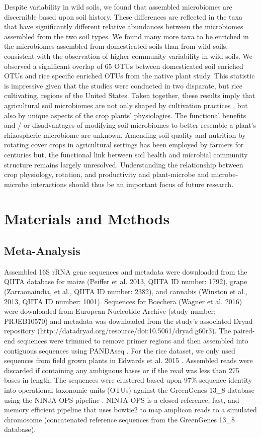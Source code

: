 Despite variability in wild soils, we found that assembled microbiomes are discernible based upon soil history. These differences are reflected in the taxa that have significantly different relative abundances between the microbiomes assembled from the two soil types. We found many more taxa to be enriched in the microbiomes assembled from domesticated soils than from wild soils, consistent with the observation of higher community variability in wild soils. We observed a significant overlap of 65 OTUs between domesticated soil enriched OTUs and rice specific enriched OTUs from the native plant study. This statistic is impressive given that the studies were conducted in two disparate, but rice cultivating, regions of the United States. Taken together, these results imply that agricultural soil microbiomes are not only shaped by cultivation practices \cite{Edwards2015}, but also by unique aspects of the crop plants' physiologies. The functional benefits and / or disadvantages of modifying soil microbiomes to better resemble a plant's rhizospheric microbiome are unknown. Amending soil quality and nutrition by rotating cover crops in agricultural settings has been employed by farmers for centuries but, the functional link between soil health and microbial community structure remains largely unresolved. Understanding the relationship between crop physiology, rotation, and productivity and plant-microbe and microbe-microbe interactions should thus be an important focus of future research.

\section{Materials and Methods}
\subsection{Meta-Analysis}
Assembled 16S rRNA gene sequences and metadata were downloaded from the QIITA database for maize (Peiffer et al. 2013, QIITA ID number: 1792), grape (Zarraonaindia, et al., QIITA ID number: 2382), and cannabis (Winston et al., 2013, QIITA ID number: 1001). Sequences for Boechera (Wagner et al. 2016) were downloaded from European Nucleotide Archive (study number: PRJEB10570) and metadata was downloaded from the study's associated Dryad repository (http://datadryad.org/resource/doi:10.5061/dryad.g60r3). The paired-end sequences were trimmed to remove primer regions and then assembled into contiguous sequences using PANDAseq \cite{Masella2012}. For the rice dataset, we only used sequences from field grown plants in Edwards et al. 2015 \cite{Edwards2015}. Assembled reads were discarded if containing any ambiguous bases or if the read was less than 275 bases in length. The sequences were clustered based upon 97\% sequence identity into operational taxonomic units (OTUs) against the GreenGenes \cite{DeSantis2006} 13\_8 database using the NINJA-OPS pipeline \cite{Al-Ghalith2016}. NINJA-OPS is a closed-reference, fast, and memory efficient pipeline that uses bowtie2 \cite{Langmead2012} to map amplicon reads to a simulated chromosome (concatenated reference sequences from the GreenGenes 13\_8 database).

